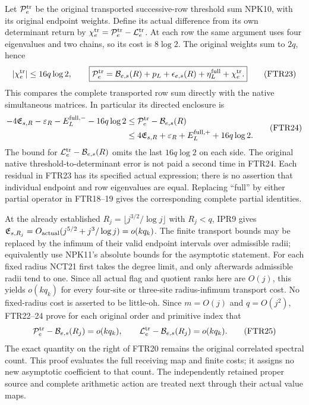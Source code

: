 \documentclass[11pt,a4paper]{article}
\begin{document}
Let $\mathcal P_e^{\rm tr}$ be the original transported successive-row
threshold sum NPK10, with its original endpoint weights. Define its
actual difference from its own determinant return by
$\chi_e^{\rm tr}=\mathcal P_e^{\rm tr}-\mathcal L_e^{\rm tr}$.
At each row the same argument uses four eigenvalues and two chains,
so its cost is $8\log2$. The original weights sum to $2q$, hence
\[
 |\chi_e^{\rm tr}|\le16q\log2,\qquad
 \boxed{\mathcal P_e^{\rm tr}
 =\mathcal B_{e,s}(R)+p_L+\epsilon_{e,s}(R)
                       +\eta_L^{\rm full}+\chi_e^{\rm tr}.}    \tag{FTR23}
\]
This compares the complete transported row sum directly with the
native simultaneous matrices. In particular its directed enclosure is
\[
\begin{split}
 -4\mathfrak E_{s,R}-\varepsilon_R-E_L^{\mathrm{full},-}
                       -16q\log2
 &\le \mathcal P_e^{\rm tr}-\mathcal B_{e,s}(R)\\
 &\le4\mathfrak E_{s,R}+\varepsilon_R+E_L^{\mathrm{full},+}
                       +16q\log2 .                      
\end{split}\tag{FTR24}
\]
The bound for $\mathcal L_e^{\rm tr}-\mathcal B_{e,s}(R)$
omits the last $16q\log2$ on each side. The original native
threshold-to-determinant error is not paid a second time in FTR24.
Each residual in FTR23 has its specified actual expression;
there is no assertion that individual endpoint and row eigenvalues
are equal. Replacing ``full'' by either partial operator in
FTR18--19 gives the corresponding complete partial identities.

At the already established $R_j=\lfloor j^{3/2}/\log j\rfloor$
with $R_j<q$, IPR9 gives
$\mathfrak E_{s,R_j}=O_{\rm actual}(j^{5/2}+j^3/\log j)
=o(kq_k)$. The finite transport bounds may be replaced by the
infimum of their valid endpoint intervals over admissible radii;
equivalently use NPK11's absolute bounds for the asymptotic statement.
For each fixed radius NCT21 first takes the degree limit, and only
afterwards admissible radii tend to one. Since all actual flag and
quotient ranks here are $O(j)$, this yields $o(kq_k)$ for every
four-site or three-site radius-infimum transport cost. No fixed-radius
cost is asserted to be little-oh. Since $m=O(j)$ and $q=O(j^2)$,
FTR22--24 prove for each original order and primitive index that
\[
 \mathcal P_e^{\rm tr}-\mathcal B_{e,s}(R_j)=o(kq_k),\qquad
 \mathcal L_e^{\rm tr}-\mathcal B_{e,s}(R_j)=o(kq_k).       \tag{FTR25}
\]
The exact quantity on the right of FTR20 remains the original
correlated spectral count. This proof evaluates the full receiving
map and finite costs; it assigns no new asymptotic coefficient to
that count. The independently retained proper source and complete
arithmetic action are treated next through their actual value maps.
\end{document}
